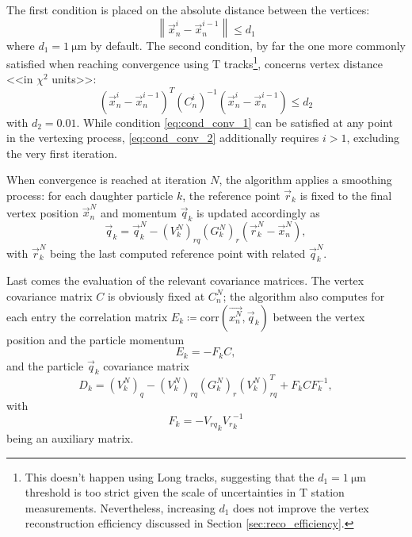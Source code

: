 The first condition is placed on the absolute distance between the vertices:
\begin{equation}
	\left\|
	\vec{x}_n^{i} - \vec{x}_n^{i-1}
	\right\| \leq d_1
	\label{eq:cond_conv_1}
\end{equation}
where $d_1 = \SI{1}{\micro\meter}$ by default.
The second condition, by far the one more commonly satisfied when reaching convergence using T tracks\footnote{This doesn't happen using Long tracks, suggesting that the $d_1 = \SI{1}{\micro\meter}$ threshold is too strict given the scale of uncertainties in T station measurements. Nevertheless, increasing $d_1$ does not improve the vertex reconstruction efficiency discussed in Section \ref{sec:reco_efficiency}.}, concerns vertex distance <<in $\chi^2$ units>>:
\begin{equation}
	{\left(
	\vec{x}_n^{i} - \vec{x}_n^{i-1}
	\right)}^T
	{(C_n^i)}^{-1}
	\left(
	\vec{x}_n^{i} - \vec{x}_n^{i-1}
	\right)
	\leq d_2
	\label{eq:cond_conv_2}
\end{equation}
with $d_2 = 0.01$.
While condition \eqref{eq:cond_conv_1} can be satisfied at any point in the vertexing process, \eqref{eq:cond_conv_2} additionally requires $i>1$, excluding the very first iteration.

When convergence is reached at iteration $N$, the algorithm applies a smoothing process: for each daughter particle $k$, the reference point $\vec{r}_k$ is fixed to the final vertex position $\vec{x}_n^{N}$ and momentum $\vec{q}_k$ is updated accordingly as
\begin{equation}
	\vec{q}_k =
	\vec{q}_k^N
	-
	{(V_k^N)}_{rq}
	{(G_k^N)}_{r}
	\left(
		\vec{r}_k^N - \vec{x}_n^N
	\right),
\end{equation}
with $\vec{r}_k^N$ being the last computed reference point with related $\vec{q}_k^N$.

Last comes the evaluation of the relevant covariance matrices. The vertex covariance matrix $C$ is obviously fixed at $C_n^N$;
the algorithm also computes for each entry the correlation matrix $E_k \coloneqq \text{corr}\left(\vec{x_n^N},\vec{q}_k\right)$ between the vertex position and the particle momentum
\begin{equation}
	E_k = - F_k C,
	\label{eq:Ek}
\end{equation}
and the particle $\vec{q}_k$ covariance matrix
\begin{equation}
	D_k =
	{(V_k^N)}_q
	-
	{(V_k^N)}_{rq}
	{(G_k^N)}_r
	{(V_k^N)}_{rq}^T
	+
	F_k C F_k^{-1},
	\label{eq:Dk}
\end{equation}
with
\begin{equation}
	F_k =
	- {V_{rq}}_k {V_r}_k^{-1}
	\label{eq:Fk}
\end{equation}
being an auxiliary matrix.

